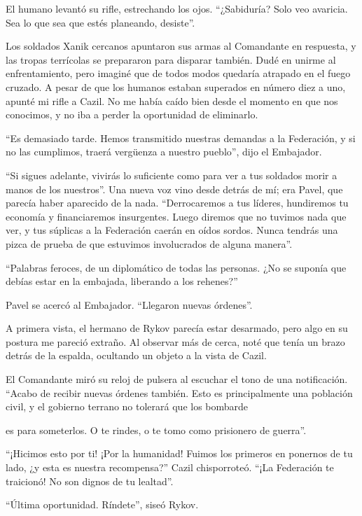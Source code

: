 \documentclass[spanish,12pt,a4paper,oneside,titlepage]{book}
\begin{document}
    El humano levantó su rifle, estrechando los ojos. ``¿Sabiduría? Solo veo avaricia. Sea lo que sea que estés planeando, desiste''.

    Los soldados Xanik cercanos apuntaron sus armas al Comandante en respuesta, y las tropas terrícolas se prepararon para disparar también. Dudé en unirme al enfrentamiento, pero imaginé que de todos modos quedaría atrapado en el fuego cruzado. A pesar de que los humanos estaban superados en número diez a uno, apunté mi rifle a Cazil. No me había caído bien desde el momento en que nos conocimos, y no iba a perder la oportunidad de eliminarlo.

    ``Es demasiado tarde. Hemos transmitido nuestras demandas a la Federación, y si no las cumplimos, traerá vergüenza a nuestro pueblo'', dijo el Embajador.

    ``Si sigues adelante, vivirás lo suficiente como para ver a tus soldados morir a manos de los nuestros''. Una nueva voz vino desde detrás de mí; era Pavel, que parecía haber aparecido de la nada. ``Derrocaremos a tus líderes, hundiremos tu economía y financiaremos insurgentes. Luego diremos que no tuvimos nada que ver, y tus súplicas a la Federación caerán en oídos sordos. Nunca tendrás una pizca de prueba de que estuvimos involucrados de alguna manera''.

    ``Palabras feroces, de un diplomático de todas las personas. ¿No se suponía que debías estar en la embajada, liberando a los rehenes?''

    Pavel se acercó al Embajador. ``Llegaron nuevas órdenes''.

    A primera vista, el hermano de Rykov parecía estar desarmado, pero algo en su postura me pareció extraño. Al observar más de cerca, noté que tenía un brazo detrás de la espalda, ocultando un objeto a la vista de Cazil.

    El Comandante miró su reloj de pulsera al escuchar el tono de una notificación. ``Acabo de recibir nuevas órdenes también. Esto es principalmente una población civil, y el gobierno terrano no tolerará que los bombarde

    es para someterlos. O te rindes, o te tomo como prisionero de guerra''.

    ``¡Hicimos esto por ti! ¡Por la humanidad! Fuimos los primeros en ponernos de tu lado, ¿y esta es nuestra recompensa?'' Cazil chisporroteó. ``¡La Federación te traicionó! No son dignos de tu lealtad''.

    ``Última oportunidad. Ríndete'', siseó Rykov.
\end{document}
